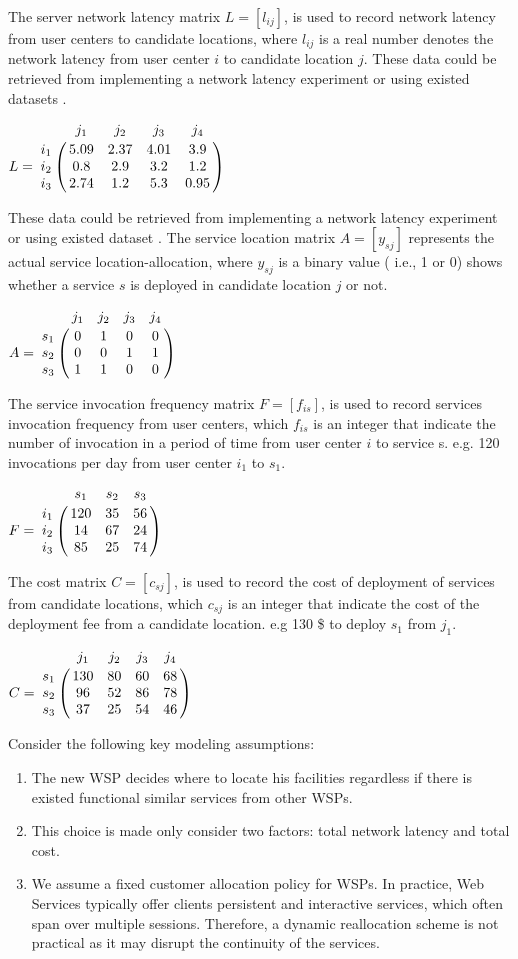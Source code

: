 \documentclass[twoside]{article}
\let\bbordermatrix\bordermatrix
\begin{document}
The server network latency matrix $L = [l_{ij}]$, is used to record network latency from user centers to 
candidate locations, where $l_{ij}$ is a real number denotes the network latency from user center $i$ to candidate 
location $j$. 
These data could be retrieved from implementing a network latency experiment or using existed datasets \cite{5552800, 6076756}.
\begin{center}
$
L = \bbordermatrix{~ & j_{1} & j_{2} & j_{3} & j_{4} \cr
					i_{1}	&5.09 &2.37 &4.01	&3.9	\cr
					i_{2}	&0.8  &2.9 &3.2	&1.2 \cr
					i_{3}	&2.74 &1.2 &5.3	&0.95 \cr} 
$
\end{center}
These data could be retrieved from implementing a network latency experiment or using existed dataset \cite{5552800, 6076756}.
The service location matrix $A = [y_{sj}]$ represents the actual service location-allocation, where $y_{sj}$  is a binary value ( i.e., 1 or 0) shows whether a service $s$ is deployed in candidate location $j$ or not.
\begin{center}
$
A = \bbordermatrix{~ & j_{1} & j_{2} & j_{3} & j_{4} \cr
					s_{1}	&0 &1 &0	&0	\cr
					s_{2}	&0  &0 &1	&1 \cr
					s_{3}	&1 &1 &0	&0 \cr} 
$
\end{center}

The service invocation frequency matrix $F= [f_{is}]$, is used to record services invocation frequency from user centers, which $f_{is}$ is an integer that indicate the number of invocation in a period of time from user center $i$ to service s. e.g. 120 invocations per day from user center $i_{1}$ to $s_{1}$.
\begin{center}
$
F = \bbordermatrix{~ & s_{1} & s_{2} & s_{3}  \cr
					i_{1}	&120 &35 &56	\cr
					i_{2}	&14  &67 &24 \cr
					i_{3}	&85 &25 &74 \cr} 
$
\end{center}

The cost matrix $C = [c_{sj}]$, is used to record the cost of deployment of services from candidate locations, 
which $c_{sj}$ is an integer that indicate the cost of the deployment fee from a candidate location. 
e.g 130 \$ to deploy $s_{1}$ from $j_{1}$.
\begin{center}
$
C = \bbordermatrix{~ & j_{1} & j_{2} & j_{3} & j_{4} \cr
					s_{1}	&130 &80 &60	&68	\cr
					s_{2}	&96  &52 &86	&78 \cr
					s_{3}	&37 &25 &54	&46 \cr} 
$
\end{center}

Consider the following key modeling assumptions:
\begin{enumerate}
	\item The new WSP decides where to locate his facilities regardless if there is existed functional similar services from other WSPs.
	\item This choice is made only consider two factors: total network latency and total cost.
	\item We assume a fixed customer allocation policy for WSPs. In practice, Web Services typically offer clients persistent and interactive services, which often span over multiple sessions. Therefore, a dynamic reallocation scheme is not practical as it may disrupt the continuity of the services.
\end{enumerate}
\end{document}
